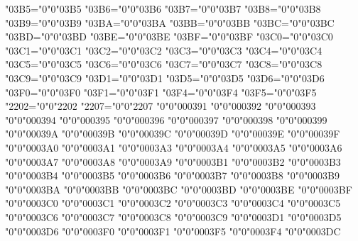{    \Umathcode"03B5="0"0"03B5%
    \Umathcode"03B6="0"0"03B6%
    \Umathcode"03B7="0"0"03B7%
    \Umathcode"03B8="0"0"03B8%
    \Umathcode"03B9="0"0"03B9%
    \Umathcode"03BA="0"0"03BA%
    \Umathcode"03BB="0"0"03BB%
    \Umathcode"03BC="0"0"03BC%
    \Umathcode"03BD="0"0"03BD%
    \Umathcode"03BE="0"0"03BE%
    \Umathcode"03BF="0"0"03BF%
    \Umathcode"03C0="0"0"03C0%
    \Umathcode"03C1="0"0"03C1%
    \Umathcode"03C2="0"0"03C2%
    \Umathcode"03C3="0"0"03C3%
    \Umathcode"03C4="0"0"03C4%
    \Umathcode"03C5="0"0"03C5%
    \Umathcode"03C6="0"0"03C6%
    \Umathcode"03C7="0"0"03C7%
    \Umathcode"03C8="0"0"03C8%
    \Umathcode"03C9="0"0"03C9%
    \Umathcode"03D1="0"0"03D1%
    \Umathcode"03D5="0"0"03D5%
    \Umathcode"03D6="0"0"03D6%
    \Umathcode"03F0="0"0"03F0%
    \Umathcode"03F1="0"0"03F1%
    \Umathcode"03F4="0"0"03F4%
    \Umathcode"03F5="0"0"03F5%
    \Umathcode"2202="0"0"2202%
    \Umathcode"2207="0"0"2207%
    \Umathchardef\Alpha     "0"0"000391%
    \Umathchardef\Beta      "0"0"000392%
    \Umathchardef\Gamma     "0"0"000393%
    \Umathchardef\Delta     "0"0"000394%
    \Umathchardef\Epsilon   "0"0"000395%
    \Umathchardef\Zeta      "0"0"000396%
    \Umathchardef\Eta       "0"0"000397%
    \Umathchardef\Theta     "0"0"000398%
    \Umathchardef\Iota      "0"0"000399%
    \Umathchardef\Kappa     "0"0"00039A%
    \Umathchardef\Lambda    "0"0"00039B%
    \Umathchardef\Mu        "0"0"00039C%
    \Umathchardef\Nu        "0"0"00039D%
    \Umathchardef\Xi        "0"0"00039E%
    \Umathchardef\Omicron   "0"0"00039F%
    \Umathchardef\Pi        "0"0"0003A0%
    \Umathchardef\Rho       "0"0"0003A1%
    \Umathchardef\Sigma     "0"0"0003A3%
    \Umathchardef\Tau       "0"0"0003A4%
    \Umathchardef\Upsilon   "0"0"0003A5%
    \Umathchardef\Phi       "0"0"0003A6%
    \Umathchardef\Chi       "0"0"0003A7%
    \Umathchardef\Psi       "0"0"0003A8%
    \Umathchardef\Omega     "0"0"0003A9%
    \Umathchardef\alpha     "0"0"0003B1%
    \Umathchardef\beta      "0"0"0003B2%
    \Umathchardef\gamma     "0"0"0003B3%
    \Umathchardef\delta     "0"0"0003B4%
    \Umathchardef\varepsilon"0"0"0003B5%
    \Umathchardef\zeta      "0"0"0003B6%
    \Umathchardef\eta       "0"0"0003B7%
    \Umathchardef\theta     "0"0"0003B8%
    \Umathchardef\iota      "0"0"0003B9%
    \Umathchardef\kappa     "0"0"0003BA%
    \Umathchardef\lambda    "0"0"0003BB%
    \Umathchardef\mu        "0"0"0003BC%
    \Umathchardef\nu        "0"0"0003BD%
    \Umathchardef\xi        "0"0"0003BE%
    \Umathchardef\omicron   "0"0"0003BF%
    \Umathchardef\pi        "0"0"0003C0%
    \Umathchardef\rho       "0"0"0003C1%
    \Umathchardef\varsigma  "0"0"0003C2%
    \Umathchardef\sigma     "0"0"0003C3%
    \Umathchardef\tau       "0"0"0003C4%
    \Umathchardef\upsilon   "0"0"0003C5%
    \Umathchardef\varphi    "0"0"0003C6%
    \Umathchardef\chi       "0"0"0003C7%
    \Umathchardef\psi       "0"0"0003C8%
    \Umathchardef\omega     "0"0"0003C9%
    \Umathchardef\vartheta  "0"0"0003D1%
    \Umathchardef\phi       "0"0"0003D5%
    \Umathchardef\varpi     "0"0"0003D6%
    \Umathchardef\varkappa  "0"0"0003F0%
    \Umathchardef\varrho    "0"0"0003F1%
    \Umathchardef\epsilon   "0"0"0003F5%
    \Umathchardef\varTheta  "0"0"0003F4%
    \Umathchardef\digamma   "0"0"0003DC%
    \relax
}

